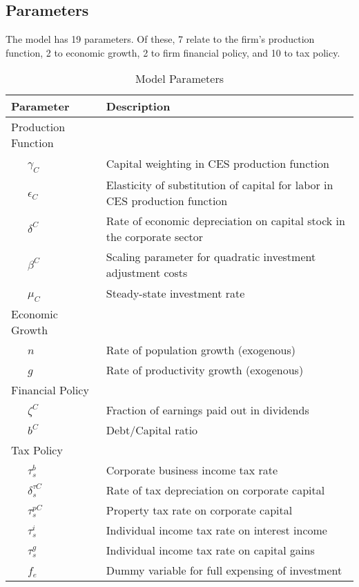 \documentclass[article,11pt,letterpaper,fleqn]{article}
\theoremstyle{definition}
\numberwithin{equation}{section}
\begin{document}
\subsection{Parameters}

The model has 19 parameters.  Of these, 7 relate to the firm's production function, 2 to economic growth, 2 to firm financial policy, and 10 to tax policy.

\begin{table}[htbp]
  \centering
  \caption{Model Parameters}
    \begin{tabular}{ll}
    \hline
    \hline
    Parameter & Description \\
    \hline
    Production Function &  \\
    \ \ \ $\gamma_{C}$ & Capital weighting in CES production function \\
    \ \ \ $\epsilon_{C}$ & Elasticity of substitution of capital for labor in CES production function \\
    \ \ \ $\delta^{C}$ & Rate of economic depreciation on capital stock in the corporate sector \\
    \ \ \ $\beta^{C}$ & Scaling parameter for quadratic investment adjustment costs \\
    \ \ \ $\mu_{C}$ & Steady-state investment rate \\
    Economic Growth &  \\
    \ \ \ $n$ & Rate of population growth (exogenous) \\
    \ \ \ $g$ & Rate of productivity growth (exogenous) \\
    Financial Policy &  \\
    \ \ \ $\zeta^{C}$ & Fraction of earnings paid out in dividends \\
    \ \ \ $b^{C}$ & Debt/Capital ratio \\
    Tax Policy &  \\
    \ \ \ $\tau^{b}_{s}$ & Corporate business income tax rate \\
    \ \ \ $\delta^{\tau C}_{s}$ & Rate of tax depreciation on corporate capital \\
    \ \ \ $\tau^{pC}_{s}$ & Property tax rate on corporate capital \\
    \ \ \ $\tau^{i}_{s}$ & Individual income tax rate on interest income \\
    \ \ \ $\tau^{g}_{s}$ & Individual income tax rate on capital gains \\
    \ \ \ $f_{e}$ & Dummy variable for full expensing of investment  \\

\end{tabular}
\end{table}
\end{document}
